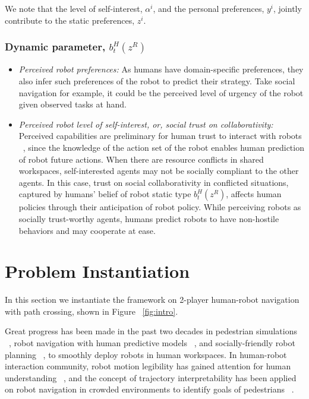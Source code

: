 \documentclass[letterpaper, 10 pt, conference]{ieeeconf}  %
\begin{document}
We note that the level of self-interest, $\alpha^i$, and the personal preferences, $y^i$, jointly contribute to the static preferences, $z^i$.

\subsubsection{Dynamic parameter, $b^H_t(z^{R})$}%
\begin{itemize}
  \item \textit{Perceived robot preferences:} As humans have domain-specific 
    preferences, they also infer such preferences of the robot to predict 
    their strategy. Take social navigation for example, it could be the 
    perceived level of urgency of the robot given observed tasks at hand.   
  \item \textit{Perceived robot level of self-interest, or, social trust on collaborativity:}
  Perceived capabilities are preliminary for human trust to interact with robots ~\cite{yang2017evaluating}, since the knowledge of the action set of the robot enables 
human prediction of robot future actions. When there are resource conflicts in shared workspaces, self-interested agents may not be socially compliant to the other agents. 
In this case, trust on social collaborativity in conflicted situations, captured by humans' belief of robot static type $b^H_t(z^R)$, affects human policies through their anticipation of robot policy. While perceiving robots as socially trust-worthy agents, humans predict robots to have non-hostile behaviors and may cooperate at ease.   
\end{itemize}



\section{Problem Instantiation}
In this section we instantiate the framework on 2-player human-robot navigation with path 
crossing, shown in Figure ~\ref{fig:intro}.


Great progress has been made in the past two decades in pedestrian simulations ~\cite{karamouzas2009predictive,zanlungo2011social}, robot navigation with human predictive models ~\cite{trautman2010unfreezing,kuderer2012feature}, and socially-friendly robot planning ~\cite{mavrogiannis2016decentralized,chen2017socially}, to smoothly deploy robots in human workspaces. In human-robot interaction community, robot motion legibility has gained attention for human understanding ~\cite{dragan2013legibility}, and the concept of trajectory interpretability has been applied on robot navigation in crowded environments to identify goals of pedestrians ~\cite{bai2015intention,unhelkar2015human}. 
\end{document}
